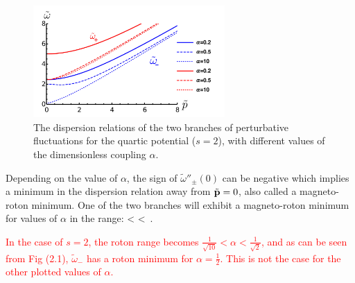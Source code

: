 \begin{figure}[H]
\begin{center}
    \includegraphics[width=0.65\textwidth]{Chapter_2_Folder_1912.11321/figures/Dispersion_relations.pdf}    
    \caption[Dispersion relations for the \textcolor{red}{a}belian Chern-Simons theory in the symmetry broken phase.]{{\small The dispersion relations of the two branches of perturbative fluctuations for the quartic potential ($s=2$), with different values of the dimensionless coupling $\alpha$.}} \label{fig:dispersion}
    \end{center}
\end{figure}
Depending on the value of $\alpha$, the sign of  $\tilde\omega''_{\pm}(0)$ can be negative which implies a minimum in the dispersion relation away from $\tilde{\bf p}=0$, also called a magneto-roton minimum. One  of the two branches  will exhibit a magneto-roton minimum  for values of $\alpha$ in the range:
\be
\quad{} < \alpha <  \,.
\ee

 \textcolor{red}{In the case of $s=2$, the roton range becomes $\frac{1}{\sqrt{10}} < \alpha < \frac{1}{\sqrt{2}}$, and as can be seen from Fig (2.1), $\tilde{\omega}_-$ has a roton minimum for $\alpha = \frac{1}{2}$. This is not the case for the other plotted values of $\alpha$.}

